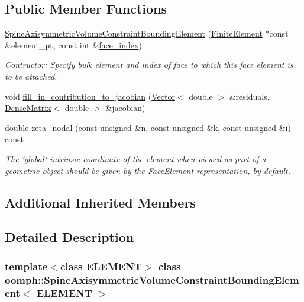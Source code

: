 \subsection*{Public Member Functions}
\begin{DoxyCompactItemize}
\item 
\hyperlink{classoomph_1_1SpineAxisymmetricVolumeConstraintBoundingElement_a5b9c09e04e27442d00950c9bf513657e}{Spine\+Axisymmetric\+Volume\+Constraint\+Bounding\+Element} (\hyperlink{classoomph_1_1FiniteElement}{Finite\+Element} $\ast$const \&element\+\_\+pt, const int \&\hyperlink{classoomph_1_1FaceElement_a478d577ac6db67ecc80f1f02ae3ab170}{face\+\_\+index})
\begin{DoxyCompactList}\small\item\em Contructor\+: Specify bulk element and index of face to which this face element is to be attached. \end{DoxyCompactList}\item 
void \hyperlink{classoomph_1_1SpineAxisymmetricVolumeConstraintBoundingElement_a5813860802c0474ef6ff5f249ca7141f}{fill\+\_\+in\+\_\+contribution\+\_\+to\+\_\+jacobian} (\hyperlink{classoomph_1_1Vector}{Vector}$<$ double $>$ \&residuals, \hyperlink{classoomph_1_1DenseMatrix}{Dense\+Matrix}$<$ double $>$ \&jacobian)
\item 
double \hyperlink{classoomph_1_1SpineAxisymmetricVolumeConstraintBoundingElement_ae15b2d0563f79ea10d23a1286831143a}{zeta\+\_\+nodal} (const unsigned \&n, const unsigned \&k, const unsigned \&\hyperlink{cfortran_8h_adb50e893b86b3e55e751a42eab3cba82}{i}) const
\begin{DoxyCompactList}\small\item\em The \char`\"{}global\char`\"{} intrinsic coordinate of the element when viewed as part of a geometric object should be given by the \hyperlink{classoomph_1_1FaceElement}{Face\+Element} representation, by default. \end{DoxyCompactList}\end{DoxyCompactItemize}
\subsection*{Additional Inherited Members}


\subsection{Detailed Description}
\subsubsection*{template$<$class E\+L\+E\+M\+E\+NT$>$\newline
class oomph\+::\+Spine\+Axisymmetric\+Volume\+Constraint\+Bounding\+Element$<$ E\+L\+E\+M\+E\+N\+T $>$}

